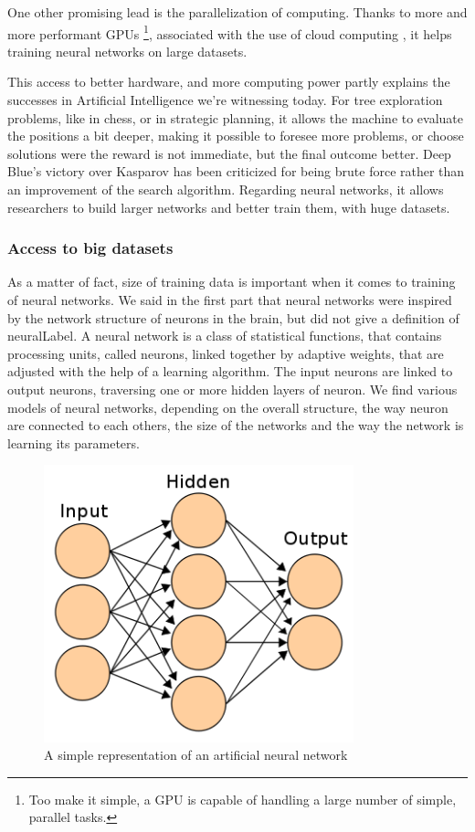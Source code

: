 \documentclass[12pt]{article}
\begin{document}
One other promising lead is the parallelization of computing. Thanks to more and
more performant GPUs \footnote{Too make it simple, a GPU is capable of handling
a large number of simple, parallel tasks.}, associated  with  the use of cloud
computing \cite{cloud}, it helps training neural networks on large datasets.

This access to better hardware, and more computing power partly explains the
successes in Artificial Intelligence we're witnessing today. For tree
exploration problems, like in chess, or in strategic planning, it allows the
machine to evaluate the positions a bit deeper, making it possible to foresee
more problems, or choose solutions were the reward is not immediate, but the
final outcome better. Deep Blue's victory  over Kasparov has been criticized for
being brute force rather than an improvement of the search algorithm. Regarding
neural networks, it allows researchers to build larger networks and better train
them, with huge datasets.

\subsubsection{Access to big datasets}


As a matter of fact, size of training data is important when it comes to
training of neural networks. We said in the first part that neural networks were
inspired by the network structure of neurons in the brain, but did not give a
definition of \gls{neuralLabel}. A neural network is a class of statistical
functions, that contains processing units, called neurons, linked together by
adaptive weights, that are adjusted with the help of a learning algorithm.
The input neurons are linked to output neurons, traversing one or more hidden
layers of neuron. We find various models of neural networks, depending on the
overall  structure, the way neuron are connected to each others, the size of
the networks and the way the network is learning its parameters.

\begin{figure}[ht]
    \centering
    \includegraphics[width=0.8\textwidth]{ann}
    \caption{A simple representation of an artificial neural network}
    \label{fig:ann}
\end{figure}
\end{document}
